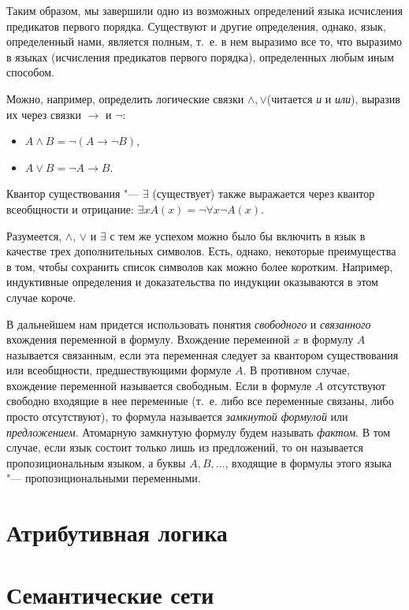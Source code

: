 \documentclass[b5paper,11pt]{book}
\begin{document}
	Таким образом, мы завершили одно из возможных определений языка исчисления предикатов первого порядка. Существуют и другие определения, однако, язык, определенный нами, является полным, т.~е. в нем выразимо все то, что выразимо в языках (исчисления предикатов первого порядка), определенных любым иным способом.
	
	Можно, например, определить логические связки $\wedge, \vee$(читается \textit{и} и \textit{или}), выразив их через связки $\rightarrow$ и $\neg$:
	\begin{itemize}
		\item $A\wedge B = \neg(A\rightarrow\neg B)$,
		\item $A\vee B =\neg A\rightarrow B$.
	\end{itemize}
	
	Квантор существования "--- $\exists$ (существует) также выражается через квантор всеобщности и отрицание: $\exists x A(x) = \neg\forall x\neg A(x)$.
	
	Разумеется, $\wedge$, $\vee$ и $\exists$ с тем же успехом можно было бы включить в язык в качестве трех дополнительных символов. Есть, однако, некоторые преимущества в том, чтобы сохранить список символов как можно более коротким. Например, индуктивные определения и доказательства по индукции оказываются в этом случае короче.
	
	В дальнейшем нам придется использовать понятия \textit{свободного} и \textit{связанного} вхождения переменной в формулу. Вхождение переменной $x$ в формулу $A$ называется связанным, если эта переменная следует за квантором существования или всеобщности, предшествующими  формуле $A$. В противном случае, вхождение переменной называется свободным. Если в формуле $A$ отсутствуют свободно входящие в нее переменные (т.~е. либо все переменные связаны, либо просто отсутствуют), то формула называется \textit{замкнутой формулой} или \textit{предложением}. Атомарную замкнутую формулу будем называть \textit{фактом}. В том случае, если язык состоит только лишь из предложений, то он называется пропозициональным языком, а буквы $A,B,\dots$, входящие в формулы этого языка "--- пропозициональными переменными.
	
	\section{Атрибутивная логика}
	\section{Семантические сети}
	
\end{document}

